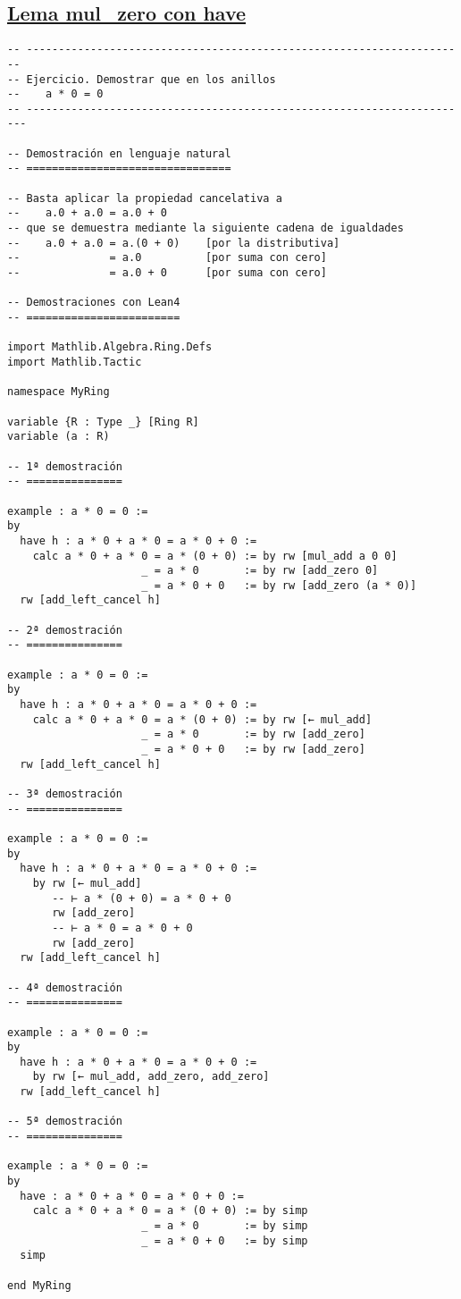 \subsection{\href{./src/Basicos/mul\_zero.lean}{Lema mul\_zero con have}}
\label{sec:org8b5d592}
\begin{verbatim}
-- ---------------------------------------------------------------------
-- Ejercicio. Demostrar que en los anillos
--    a * 0 = 0
-- ----------------------------------------------------------------------

-- Demostración en lenguaje natural
-- ================================

-- Basta aplicar la propiedad cancelativa a
--    a.0 + a.0 = a.0 + 0
-- que se demuestra mediante la siguiente cadena de igualdades
--    a.0 + a.0 = a.(0 + 0)    [por la distributiva]
--              = a.0          [por suma con cero]
--              = a.0 + 0      [por suma con cero]

-- Demostraciones con Lean4
-- ========================

import Mathlib.Algebra.Ring.Defs
import Mathlib.Tactic

namespace MyRing

variable {R : Type _} [Ring R]
variable (a : R)

-- 1ª demostración
-- ===============

example : a * 0 = 0 :=
by
  have h : a * 0 + a * 0 = a * 0 + 0 :=
    calc a * 0 + a * 0 = a * (0 + 0) := by rw [mul_add a 0 0]
                     _ = a * 0       := by rw [add_zero 0]
                     _ = a * 0 + 0   := by rw [add_zero (a * 0)]
  rw [add_left_cancel h]

-- 2ª demostración
-- ===============

example : a * 0 = 0 :=
by
  have h : a * 0 + a * 0 = a * 0 + 0 :=
    calc a * 0 + a * 0 = a * (0 + 0) := by rw [← mul_add]
                     _ = a * 0       := by rw [add_zero]
                     _ = a * 0 + 0   := by rw [add_zero]
  rw [add_left_cancel h]

-- 3ª demostración
-- ===============

example : a * 0 = 0 :=
by
  have h : a * 0 + a * 0 = a * 0 + 0 :=
    by rw [← mul_add]
       -- ⊢ a * (0 + 0) = a * 0 + 0
       rw [add_zero]
       -- ⊢ a * 0 = a * 0 + 0
       rw [add_zero]
  rw [add_left_cancel h]

-- 4ª demostración
-- ===============

example : a * 0 = 0 :=
by
  have h : a * 0 + a * 0 = a * 0 + 0 :=
    by rw [← mul_add, add_zero, add_zero]
  rw [add_left_cancel h]

-- 5ª demostración
-- ===============

example : a * 0 = 0 :=
by
  have : a * 0 + a * 0 = a * 0 + 0 :=
    calc a * 0 + a * 0 = a * (0 + 0) := by simp
                     _ = a * 0       := by simp
                     _ = a * 0 + 0   := by simp
  simp

end MyRing
\end{verbatim}

